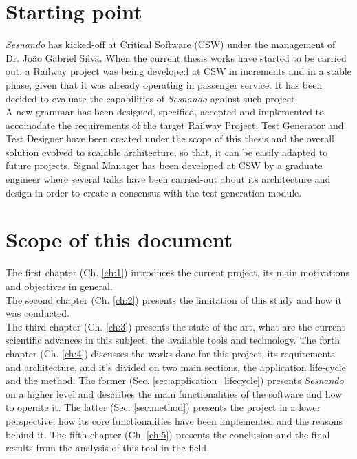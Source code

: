 \newpage
\section{Starting point}
\label{sec:starting_point}

\textit{Sesnando} has kicked-off at Critical Software (CSW) under the management of Dr. João Gabriel Silva. When the current thesis works have started to be carried out, a Railway project was being developed at CSW in increments and in a stable phase, given that it was already operating in passenger service. It has been decided to evaluate the capabilities of \textit{Sesnando} against such project.\\
A new grammar has been designed, specified, accepted and implemented to accomodate the requirements of the target Railway Project. Test Generator and Test Designer have been created under the scope of this thesis and the overall solution evolved to scalable architecture, so that, it can be easily adapted to future projects.
Signal Manager has been developed at CSW by a graduate engineer where several talks have been carried-out about its architecture and design in order to create a consensus with the test generation module.


\section{Scope of this document}
\label{sec:document_scope}

The first chapter (Ch. \ref{ch:1}) introduces the current project, its main motivations and objectives in general.\\
The second chapter (Ch. \ref{ch:2}) presents the limitation of this study and how it was conducted.\\
The third chapter (Ch. \ref{ch:3}) presents the state of the art, what are the current scientific advances in this subject, the available tools and technology.
The forth chapter (Ch. \ref{ch:4}) discusses the works done for this project, its requirements and architecture, and it's divided on two main sections, the application life-cycle and the method. The former (Sec. \ref{sec:application_lifecycle}) presents \textit{Sesnando} on a higher level and describes the main functionalities of the software and how to operate it. The latter (Sec. \ref{sec:method}) presents the project in a lower perspective, how its core functionalities have been implemented and the reasons behind it.
The fifth chapter (Ch. \ref{ch:5}) presents the conclusion and the final results from the analysis of this tool in-the-field.
